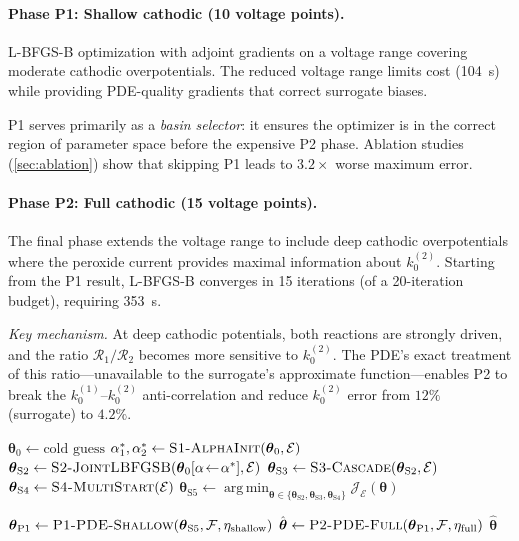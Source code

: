 \documentclass[11pt,a4paper]{article}
\newcommand{\vect}[1]{\boldsymbol{#1}}
\newcommand{\kzero}{k_0}
\newcommand{\Jobj}{\mathcal{J}}
\DeclareMathOperator*{\argmin}{arg\,min}
\begin{document}
\paragraph{Phase P1: Shallow cathodic (10 voltage points).}
L-BFGS-B optimization with adjoint gradients on a voltage range
covering moderate cathodic overpotentials. The reduced voltage range
limits cost (\SI{104}{\second}) while providing PDE-quality gradients that
correct surrogate biases.

P1 serves primarily as a \emph{basin selector}: it ensures the optimizer
is in the correct region of parameter space before the expensive P2
phase. Ablation studies (\cref{sec:ablation}) show that skipping P1
leads to $3.2\times$ worse maximum error.

\paragraph{Phase P2: Full cathodic (15 voltage points).}
The final phase extends the voltage range to include deep cathodic
overpotentials where the peroxide current provides maximal information
about $\kzero^{(2)}$. Starting from the P1 result, L-BFGS-B converges
in 15 iterations (of a 20-iteration budget), requiring \SI{353}{\second}.

\emph{Key mechanism.} At deep cathodic potentials, both reactions are
strongly driven, and the ratio $\mathcal{R}_1/\mathcal{R}_2$ becomes
more sensitive to $\kzero^{(2)}$. The PDE's exact treatment of this
ratio---unavailable to the surrogate's approximate function---enables P2
to break the $\kzero^{(1)}$--$\kzero^{(2)}$ anti-correlation and reduce
$\kzero^{(2)}$ error from $12\%$ (surrogate) to $4.2\%$.

\begin{algorithm}[H]
\DontPrintSemicolon
\caption{v13 Inference Pipeline}\label{alg:pipeline}
\KwOut{Estimated parameters $\hat{\vect{\theta}}$}

\BlankLine
{}
$\vect{\theta}_0 \gets \text{cold guess}$\;
$\alpha_1^*, \alpha_2^* \gets \textsc{S1-AlphaInit}(\vect{\theta}_0, \mathcal{E})$\;
$\vect{\theta}_{\text{S2}} \gets \textsc{S2-JointLBFGSB}(\vect{\theta}_0[\alpha\!\gets\!\alpha^*], \mathcal{E})$\;
$\vect{\theta}_{\text{S3}} \gets \textsc{S3-Cascade}(\vect{\theta}_{\text{S2}}, \mathcal{E})$\;
$\vect{\theta}_{\text{S4}} \gets \textsc{S4-MultiStart}(\mathcal{E})$\;
$\vect{\theta}_{\text{S5}} \gets \argmin_{\vect{\theta} \in \{\vect{\theta}_{\text{S2}}, \vect{\theta}_{\text{S3}}, \vect{\theta}_{\text{S4}}\}} \Jobj_{\mathcal{E}}(\vect{\theta})$\;

\BlankLine
{}
$\vect{\theta}_{\text{P1}} \gets \textsc{P1-PDE-Shallow}(\vect{\theta}_{\text{S5}}, \mathcal{F}, \eta_{\text{shallow}})$\;
$\hat{\vect{\theta}} \gets \textsc{P2-PDE-Full}(\vect{\theta}_{\text{P1}}, \mathcal{F}, \eta_{\text{full}})$\;
\Return $\hat{\vect{\theta}}$\;
\end{algorithm}
\end{document}
